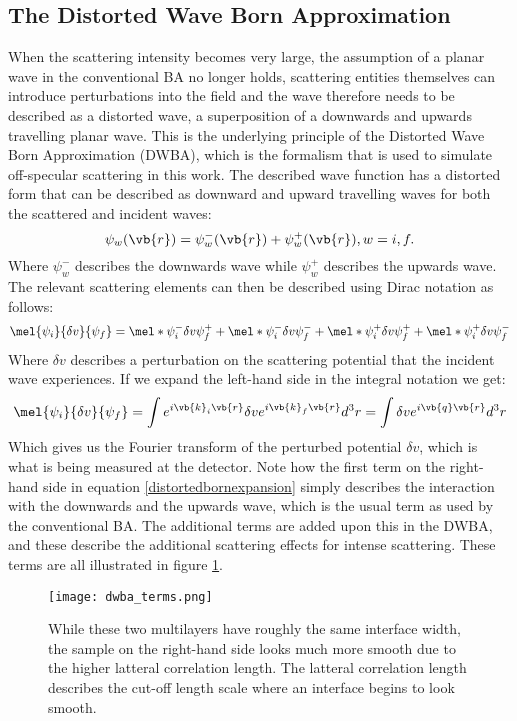 \subsection{The Distorted Wave Born Approximation}
When the scattering intensity becomes very large, the assumption of a planar wave in the conventional BA no longer holds, scattering entities themselves can introduce perturbations into the field and the wave therefore needs to be described as a distorted wave, a superposition of a downwards and upwards travelling planar wave. This is the underlying principle of the Distorted Wave Born Approximation (DWBA), which is the formalism that is used to simulate off-specular scattering in this work. The described wave function has a distorted form that can be described as downward and upward travelling waves for both the scattered and incident waves:
\begin{equation}
	\psi_w(\vb{r}) = \psi_w^-(\vb{r}) + \psi_w^+(\vb{r}), w = i, f.
\end{equation}
Where $\psi_w^-$ describes the downwards wave while $\psi_w^+$ describes the upwards wave. The relevant scattering elements can then be described using Dirac notation as follows:
\begin{equation}\label{distortedbornexpansion}
	\mel{\psi_i}{\delta v}{\psi_f} = \mel*{\psi_i^-}{\delta v}{\psi_f^+} + \mel*{\psi_i^-}{\delta v}{\psi_f^-} + \mel*{\psi_i^+}{\delta v}{\psi_f^+} + \mel*{\psi_i^+}{\delta v}{\psi_f^-}
\end{equation} 
Where $\delta v$ describes a perturbation on the scattering potential that the incident wave experiences. If we expand the left-hand side in the integral notation we get:
\begin{equation}
	\mel{\psi_i}{\delta v}{\psi_f} = \int e^{i\vb{k}_i\vb{r}}\delta v e^{i\vb{k}_f\vb{r}}d^3 r = \int \delta v e^{i\vb{q}\vb{r}}d^3 r 
\end{equation}
 Which gives us the Fourier transform of the perturbed potential $\delta v$, which is what is being measured at the detector. Note how the first term on the right-hand side in equation \ref{distortedbornexpansion} simply describes the interaction with the downwards and the upwards wave, which is the usual term as used by the conventional BA. The additional terms are added upon this in the DWBA, and these describe the additional scattering effects for intense scattering. These terms are all illustrated in figure \ref{dwba_terms}.
\begin{figure}
	\centering
	\texttt{[image: dwba\_terms.png]}
	\caption{While these two multilayers have roughly the same interface width, the sample on the right-hand side looks much more smooth due to the higher latteral correlation length. The latteral correlation length describes the cut-off length scale where an interface begins to look smooth.}
	\label{dwba_terms}
\end{figure}

